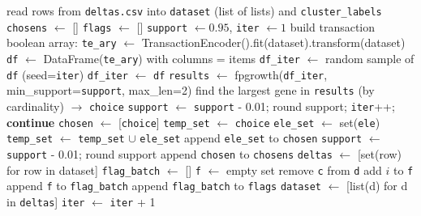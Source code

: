 \documentclass[unnumsec,webpdf,contemporary,large]{oup-authoring-template}
\begin{document}
\begin{algorithmic}[1]
  \State read rows from \texttt{deltas.csv} into \texttt{dataset} (list of lists) and \texttt{cluster\_labels}
  \State \texttt{chosens} $\leftarrow$ [] 
  \State \texttt{flags} $\leftarrow$ [] 
  \State \texttt{support} $\leftarrow 0.95$, \texttt{iter} $\leftarrow 1$
    \State build transaction boolean array: \texttt{te\_ary} $\leftarrow$ TransactionEncoder().fit(dataset).transform(dataset)
    \State \texttt{df} $\leftarrow$ DataFrame(\texttt{te\_ary}) with columns = items
      \State \texttt{df\_iter} $\leftarrow$ random sample of \texttt{df} (seed=\texttt{iter})
    \Else
      \State \texttt{df\_iter} $\leftarrow$ \texttt{df}
    \EndIf
    \State \texttt{results} $\leftarrow$ fpgrowth(\texttt{df\_iter}, min\_support=\texttt{support}, max\_len=2)
    \State find the largest gene in \texttt{results} (by cardinality) $\to$ \texttt{choice}
      \State \texttt{support} $\leftarrow$ \texttt{support} - 0.01; round support; \texttt{iter}++; \textbf{continue}
    \EndIf
    \State \texttt{chosen} $\leftarrow$ [\texttt{choice}]
    \State \texttt{temp\_set} $\leftarrow$ \texttt{choice}
      \State \texttt{ele\_set} $\leftarrow$ set(\texttt{ele})
        \State \texttt{temp\_set} $\leftarrow$ \texttt{temp\_set} $\cup$ \texttt{ele\_set}
        \State append \texttt{ele\_set} to \texttt{chosen}
      \EndIf
    \EndFor
      \State \texttt{support} $\leftarrow$ \texttt{support} - 0.01; round support
    \EndIf
    \State append \texttt{chosen} to \texttt{chosens}
    \State \texttt{deltas} $\leftarrow$ [set(row) for row in dataset]
    \State \texttt{flag\_batch} $\leftarrow$ []
      \State \texttt{f} $\leftarrow$ empty set
          \State remove \texttt{c} from \texttt{d} 
          \State add $i$ to \texttt{f}
        \EndIf
      \EndFor
      \State append \texttt{f} to \texttt{flag\_batch}
    \EndFor
    \State append \texttt{flag\_batch} to \texttt{flags}
    \State \texttt{dataset} $\leftarrow$ [list(d) for d in \texttt{deltas}]
    \State \texttt{iter} $\leftarrow$ \texttt{iter} + 1
  \EndWhile


\end{algorithmic}
\end{document}
